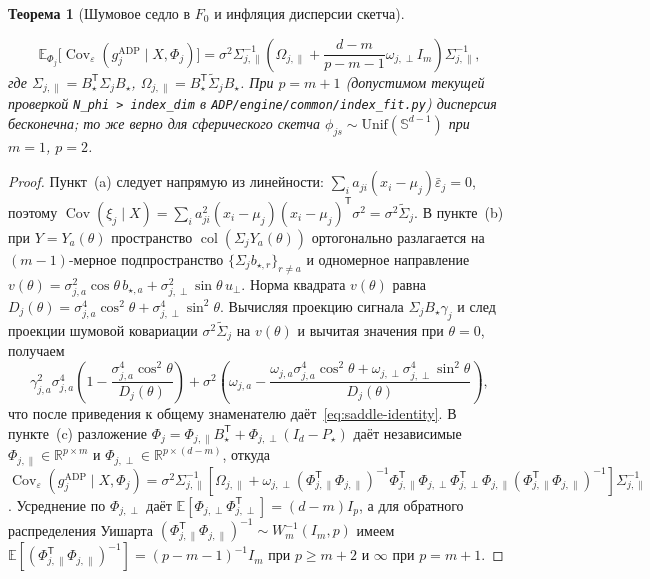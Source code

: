 \documentclass[11pt,a4paper]{article}
\numberwithin{equation}{section}
\newtheorem{theorem}{Теорема}[section]
\theoremstyle{definition}
\theoremstyle{remark}
\newcommand{\R}{\mathbb{R}}
\newcommand{\E}{\mathbb{E}}
\newcommand{\Cov}{\operatorname{Cov}}
\newcommand{\col}{\operatorname{col}}
\newcommand{\T}{^{\mathsf T}}
\newcommand{\code}[1]{\nolinkurl{#1}}
\begin{document}
\begin{theorem}[Шумовое седло в $F_0$ и инфляция дисперсии скетча]
\begin{enumerate}[label=(\alph*)]
  \begin{equation}\label{eq:sketch-inflation}
    \E_{\Phi_j}\!\bigl[\Cov_\varepsilon(g_j^{\mathrm{ADP}} \mid X, \Phi_j)\bigr]
    = \sigma^2 \Sigma_{j,\parallel}^{-1}\!\left(\Omega_{j,\parallel}
      + \frac{d-m}{p-m-1}\omega_{j,\perp} I_m\right)\!\Sigma_{j,\parallel}^{-1},
  \end{equation}
  где $\Sigma_{j,\parallel} = B_\star\T \Sigma_j B_\star$, $\Omega_{j,\parallel} = B_\star\T \widetilde{\Sigma}_j B_\star$.
  При $p = m + 1$ (допустимом текущей проверкой \code{N_phi > index_dim} в \code{ADP/engine/common/index_fit.py})
  дисперсия бесконечна; то же верно для сферического скетча $\phi_{js} \sim \mathrm{Unif}(\mathbb{S}^{d-1})$ при $m=1$, $p=2$.
\end{enumerate}
\end{theorem}

\begin{proof}
Пункт~(a) следует напрямую из линейности: $\sum_i a_{ji}(x_i-\mu_j)\bar\varepsilon_j = 0$,
поэтому $\Cov(\xi_j \mid X) = \sum_i a_{ji}^2 (x_i-\mu_j)(x_i-\mu_j)\T \sigma^2 = \sigma^2 \widetilde{\Sigma}_j$.
В пункте~(b) при $Y = Y_a(\theta)$ пространство $\col(\Sigma_j Y_a(\theta))$ ортогонально
разлагается на $(m-1)$-мерное подпространство $\{\Sigma_j b_{\star,r}\}_{r \ne a}$
и одномерное направление $v(\theta) = \sigma_{j,a}^2 \cos\theta\, b_{\star,a} + \sigma_{j,\perp}^2 \sin\theta\, u_\perp$.
Норма квадрата $v(\theta)$ равна $D_j(\theta) = \sigma_{j,a}^4 \cos^2\theta + \sigma_{j,\perp}^4 \sin^2\theta$.
Вычисляя проекцию сигнала $\Sigma_j B_\star \gamma_j$ и след проекции шумовой ковариации
$\sigma^2 \widetilde{\Sigma}_j$ на $v(\theta)$ и вычитая значения при $\theta = 0$, получаем
\[
  \gamma_{j,a}^2 \sigma_{j,a}^4 \left(1 - \frac{\sigma_{j,a}^4 \cos^2\theta}{D_j(\theta)}\right)
  + \sigma^2 \left(\omega_{j,a} - \frac{\omega_{j,a}\sigma_{j,a}^4\cos^2\theta + \omega_{j,\perp}\sigma_{j,\perp}^4\sin^2\theta}{D_j(\theta)}\right),
\]
что после приведения к общему знаменателю даёт~\eqref{eq:saddle-identity}.
В пункте~(c) разложение $\Phi_j = \Phi_{j,\parallel} B_\star\T + \Phi_{j,\perp}(I_d - P_\star)$
даёт независимые $\Phi_{j,\parallel} \in \R^{p \times m}$ и $\Phi_{j,\perp} \in \R^{p \times (d-m)}$,
откуда $\Cov_\varepsilon(g_j^{\mathrm{ADP}} \mid X, \Phi_j) = \sigma^2 \Sigma_{j,\parallel}^{-1}
[\Omega_{j,\parallel} + \omega_{j,\perp}(\Phi_{j,\parallel}\T \Phi_{j,\parallel})^{-1} \Phi_{j,\parallel}\T \Phi_{j,\perp} \Phi_{j,\perp}\T \Phi_{j,\parallel} (\Phi_{j,\parallel}\T \Phi_{j,\parallel})^{-1}] \Sigma_{j,\parallel}^{-1}$.
Усреднение по $\Phi_{j,\perp}$ даёт $\E[\Phi_{j,\perp}\Phi_{j,\perp}\T] = (d-m) I_p$,
а для обратного распределения Уишарта $(\Phi_{j,\parallel}\T \Phi_{j,\parallel})^{-1} \sim W_m^{-1}(I_m, p)$
имеем $\E[(\Phi_{j,\parallel}\T \Phi_{j,\parallel})^{-1}] = (p - m - 1)^{-1} I_m$ при $p \ge m+2$ и $\infty$ при $p = m+1$.
\end{proof}
\end{document}
